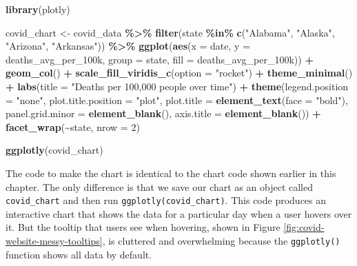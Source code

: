\documentclass[
]{book}
\newenvironment{Shaded}{\begin{snugshade}}{\end{snugshade}}
\newcommand{\AttributeTok}[1]{\textcolor[rgb]{0.13,0.29,0.53}{#1}}
\newcommand{\DecValTok}[1]{\textcolor[rgb]{0.00,0.00,0.81}{#1}}
\newcommand{\FunctionTok}[1]{\textcolor[rgb]{0.13,0.29,0.53}{\textbf{#1}}}
\newcommand{\NormalTok}[1]{#1}
\newcommand{\OtherTok}[1]{\textcolor[rgb]{0.56,0.35,0.01}{#1}}
\newcommand{\SpecialCharTok}[1]{\textcolor[rgb]{0.81,0.36,0.00}{\textbf{#1}}}
\newcommand{\StringTok}[1]{\textcolor[rgb]{0.31,0.60,0.02}{#1}}
\begin{document}
\begin{Shaded}
\begin{Highlighting}[]
\FunctionTok{library}\NormalTok{(plotly)}

\NormalTok{covid\_chart }\OtherTok{\textless{}{-}}\NormalTok{ covid\_data }\SpecialCharTok{\%\textgreater{}\%} 
  \FunctionTok{filter}\NormalTok{(state }\SpecialCharTok{\%in\%} \FunctionTok{c}\NormalTok{(}\StringTok{"Alabama"}\NormalTok{,}
                      \StringTok{"Alaska"}\NormalTok{,}
                      \StringTok{"Arizona"}\NormalTok{,}
                      \StringTok{"Arkansas"}\NormalTok{)) }\SpecialCharTok{\%\textgreater{}\%} 
  \FunctionTok{ggplot}\NormalTok{(}\FunctionTok{aes}\NormalTok{(}\AttributeTok{x =}\NormalTok{ date,}
             \AttributeTok{y =}\NormalTok{ deaths\_avg\_per\_100k,}
             \AttributeTok{group =}\NormalTok{ state,}
             \AttributeTok{fill =}\NormalTok{ deaths\_avg\_per\_100k)) }\SpecialCharTok{+}
  \FunctionTok{geom\_col}\NormalTok{() }\SpecialCharTok{+}
  \FunctionTok{scale\_fill\_viridis\_c}\NormalTok{(}\AttributeTok{option =} \StringTok{"rocket"}\NormalTok{) }\SpecialCharTok{+}
  \FunctionTok{theme\_minimal}\NormalTok{() }\SpecialCharTok{+}
  \FunctionTok{labs}\NormalTok{(}\AttributeTok{title =} \StringTok{"Deaths per 100,000 people over time"}\NormalTok{) }\SpecialCharTok{+}
  \FunctionTok{theme}\NormalTok{(}\AttributeTok{legend.position =} \StringTok{"none"}\NormalTok{,}
        \AttributeTok{plot.title.position =} \StringTok{"plot"}\NormalTok{,}
        \AttributeTok{plot.title =} \FunctionTok{element\_text}\NormalTok{(}\AttributeTok{face =} \StringTok{"bold"}\NormalTok{),}
        \AttributeTok{panel.grid.minor =} \FunctionTok{element\_blank}\NormalTok{(),}
        \AttributeTok{axis.title =} \FunctionTok{element\_blank}\NormalTok{()) }\SpecialCharTok{+}
  \FunctionTok{facet\_wrap}\NormalTok{(}\SpecialCharTok{\textasciitilde{}}\NormalTok{state,}
             \AttributeTok{nrow =} \DecValTok{2}\NormalTok{)}


\FunctionTok{ggplotly}\NormalTok{(covid\_chart)}
\end{Highlighting}
\end{Shaded}

The code to make the chart is identical to the chart code shown earlier in this chapter. The only difference is that we save our chart as an object called \texttt{covid\_chart} and then run \texttt{ggplotly(covid\_chart)}. This code produces an interactive chart that shows the data for a particular day when a user hovers over it. But the tooltip that users see when hovering, shown in Figure \ref{fig:covid-website-messy-tooltips}, is cluttered and overwhelming because the \texttt{ggplotly()} function shows all data by default.
\end{document}
